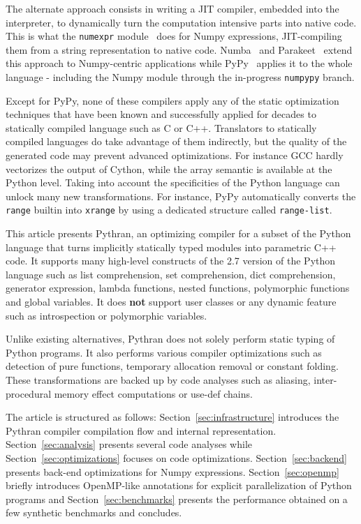 \documentclass[10pt, onecolumn, preprint]{sigplanconf}
\begin{document}
The alternate approach consists in writing a JIT compiler, embedded into the
interpreter, to dynamically turn the computation intensive parts into native
code. This is what the \texttt{numexpr} module~\cite{numexpr} does for Numpy 
expressions, JIT-compiling them from a string representation to native code.
Numba~\cite{numba} and Parakeet~\cite{parakeet2012} extend this approach to
Numpy-centric applications while PyPy~\cite{pypy2009} applies it to the whole
language - including the Numpy module through the in-progress \texttt{numpypy}
branch.

Except for PyPy, none of these compilers apply any of the static optimization
techniques that have been known and successfully applied 
for decades to statically compiled language such as C or C++.  Translators to
statically compiled languages do take advantage of them indirectly, but the
quality of the generated code may prevent advanced optimizations. For instance
GCC hardly vectorizes the output of Cython, while the array semantic is
available at the Python level. Taking into account the specificities of the
Python language can unlock many new transformations.  For instance, PyPy
automatically converts the \texttt{range} builtin into \texttt{xrange} by using
a dedicated structure called \texttt{range-list}.

This article presents Pythran, an optimizing compiler for a subset of the
Python language that turns implicitly statically typed modules into parametric
C++ code. It supports many high-level constructs of the 2.7 version of the
Python language such as list comprehension, set comprehension, dict
comprehension, generator expression, lambda functions, nested functions,
polymorphic functions and global variables. It does \textbf{not} support user
classes or any dynamic feature such as introspection or polymorphic variables.

Unlike existing alternatives, Pythran does not solely perform static typing of
Python programs. It also performs various compiler optimizations such as
detection of pure functions, temporary allocation removal or constant folding.
These transformations are backed up by code analyses such as aliasing,
inter-procedural memory effect computations or use-def chains.

The article is structured as follows: Section~\ref{sec:infrastructure}
introduces the Pythran compiler compilation flow and internal representation.
Section~\ref{sec:analysis} presents several code analyses while
Section~\ref{sec:optimizations} focuses on code optimizations.
Section~\ref{sec:backend} presents back-end optimizations for Numpy
expressions. Section~\ref{sec:openmp}  briefly introduces OpenMP-like
annotations for explicit parallelization of Python programs and
Section~\ref{sec:benchmarks} presents the performance obtained on a few
synthetic benchmarks and concludes.
\end{document}
